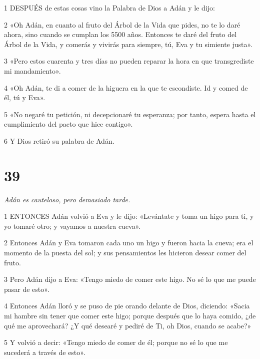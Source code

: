 \par 1 DESPUÉS de estas cosas vino la Palabra de Dios a Adán y le dijo:

\par 2 «Oh Adán, en cuanto al fruto del Árbol de la Vida que pides, no te lo daré ahora, sino cuando se cumplan los 5500 años. Entonces te daré del fruto del Árbol de la Vida, y comerás y vivirás para siempre, tú, Eva y tu simiente justa».

\par 3 «Pero estos cuarenta y tres días no pueden reparar la hora en que transgrediste mi mandamiento».

\par 4 «Oh Adán, te di a comer de la higuera en la que te escondiste. Id y comed de él, tú y Eva».

\par 5 «No negaré tu petición, ni decepcionaré tu esperanza; por tanto, espera hasta el cumplimiento del pacto que hice contigo».

\par 6 Y Dios retiró su palabra de Adán.

\chapter{39}

\par \textit{Adán es cauteloso, pero demasiado tarde.}

\par 1 ENTONCES Adán volvió a Eva y le dijo: «Levántate y toma un higo para ti, y yo tomaré otro; y vayamos a nuestra cueva».

\par 2 Entonces Adán y Eva tomaron cada uno un higo y fueron hacia la cueva; era el momento de la puesta del sol; y sus pensamientos les hicieron desear comer del fruto.

\par 3 Pero Adán dijo a Eva: «Tengo miedo de comer este higo. No sé lo que me puede pasar de esto».

\par 4 Entonces Adán lloró y se puso de pie orando delante de Dios, diciendo: «Sacia mi hambre sin tener que comer este higo; porque después que lo haya comido, ¿de qué me aprovechará? ¿Y qué desearé y pediré de Ti, oh Dios, cuando se acabe?»

\par 5 Y volvió a decir: «Tengo miedo de comer de él; porque no sé lo que me sucederá a través de esto».

